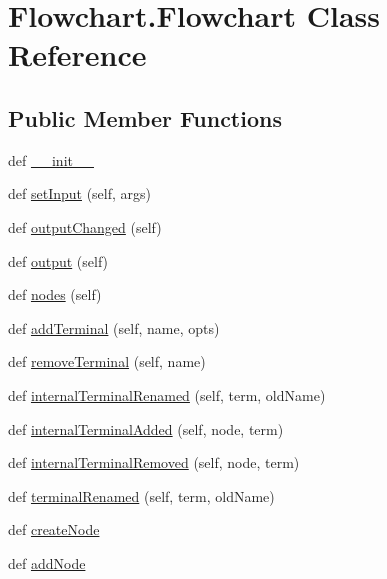 \hypertarget{classFlowchart_1_1Flowchart}{}\section{Flowchart.\+Flowchart Class Reference}
\label{classFlowchart_1_1Flowchart}
\subsection*{Public Member Functions}
\begin{DoxyCompactItemize}
\item 
def \hyperlink{classFlowchart_1_1Flowchart_ad01c1cfa5be95c82787f50ebdeced37c}{\+\_\+\+\_\+init\+\_\+\+\_\+}
\item 
def \hyperlink{classFlowchart_1_1Flowchart_acf7999a21b56d2f16c041b29ebaa0784}{set\+Input} (self, args)
\item 
def \hyperlink{classFlowchart_1_1Flowchart_a50ec9918ac88ec192440432cb4b7f5c8}{output\+Changed} (self)
\item 
def \hyperlink{classFlowchart_1_1Flowchart_a209863397ba23f0be82e6d6f76b37e04}{output} (self)
\item 
def \hyperlink{classFlowchart_1_1Flowchart_aba7382cf9ca0a27179877148a519877d}{nodes} (self)
\item 
def \hyperlink{classFlowchart_1_1Flowchart_a3f7409d6306664a36c9f50068fee803b}{add\+Terminal} (self, name, opts)
\item 
def \hyperlink{classFlowchart_1_1Flowchart_af1c3df680c1b2114d60ed2cfe61ba0c3}{remove\+Terminal} (self, name)
\item 
def \hyperlink{classFlowchart_1_1Flowchart_a14319c85dd89b3d47fde2ed65a15c722}{internal\+Terminal\+Renamed} (self, term, old\+Name)
\item 
def \hyperlink{classFlowchart_1_1Flowchart_a6a71d8c6a0400840a8d507dee10062d3}{internal\+Terminal\+Added} (self, node, term)
\item 
def \hyperlink{classFlowchart_1_1Flowchart_aad6813e7deb3af24c41314adadf23993}{internal\+Terminal\+Removed} (self, node, term)
\item 
def \hyperlink{classFlowchart_1_1Flowchart_ac90784cc7b61b947c8844da28e6aa515}{terminal\+Renamed} (self, term, old\+Name)
\item 
def \hyperlink{classFlowchart_1_1Flowchart_a7df20dd863563528c60699de4f51a61a}{create\+Node}
\item 
def \hyperlink{classFlowchart_1_1Flowchart_a17f913f90039efc50d849484375d018a}{add\+Node}

\end{DoxyCompactItemize}
